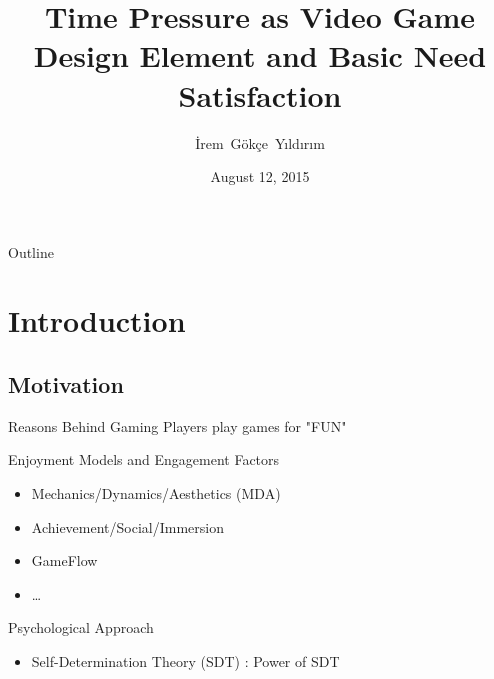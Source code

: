 \documentclass{beamer}
\title[Time Pressure as Video Game Design Element and Basic Need Satisfaction] 
{%
  Time Pressure as Video Game Design Element and Basic Need Satisfaction%
}
\author[İrem Gökçe Yıldırım]
{
  İrem~Gökçe~Yıldırım
}
\institute[METU]
{
  Middle East Technical University
  \and
  \vskip+2mm
  \textit{iremgokceyildirim@gmail.com}
}
\date[August 2015]
{August 12, 2015}
\newcommand\includegraphicscopyright[3][]{%
  \leavevmode\vbox{\vskip10pt\raggedright\setbox\mytempbox=\hbox{\texttt{[image: \#2]}}%
    \mytempdimen=\wd\mytempbox\box\mytempbox\par\vskip1pt%
    \fontsize{3.5}{4}\selectfont{\color{black!25}{\vbox{\hsize=\mytempdimen#3}}}\vskip3pt%
}}
\begin{document}
\begin{frame}
  \titlepage
\end{frame}

\begin{frame}{Outline}
  \tableofcontents[hideothersubsections]
\end{frame}


\section{Introduction}

\subsection{Motivation}

\begin{frame}{Reasons Behind Gaming}
	Players play games for "FUN" \cite{Kocca2013WhitePaper}
	\begin{block}{Enjoyment Models and Engagement Factors}
    \begin{itemize}
    \item Mechanics/Dynamics/Aesthetics (MDA) \cite{hunicke2004mda}
    \item Achievement/Social/Immersion \cite{yee2007motivations}
    \item GameFlow \cite{Sweetser2005flow}     
    \item \dots 
    
    \end{itemize}
  \end{block}
  \begin{block}{Psychological Approach}
    \begin{itemize}
    \item \alert{Self-Determination Theory (SDT)} \cite{RyanDeci2000IntrinsicExtrinsic} : Power of SDT
    \end{itemize}
  \end{block}
\end{frame}
\end{document}
